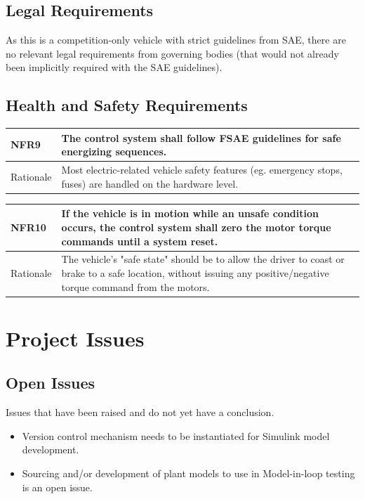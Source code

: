 \documentclass[12pt]{article}
\newcommand{\tableVspace}{5mm}
\newcommand{\ReqColA}{0.13\textwidth}
\newcommand{\ReqColB}{0.82\textwidth}
\begin{document}
\subsection{Legal Requirements}
As this is a competition-only vehicle with strict guidelines from SAE, there are no relevant legal requirements from governing bodies (that would not already been implicitly required with the SAE guidelines). 

\subsection{Health and Safety Requirements}

\vspace{\tableVspace}\noindent
\begin{tabular}{| p{\ReqColA} | p{\ReqColB}|}
\hline
\rowcolor[gray]{0.9}
NFR9 & The control system shall follow FSAE guidelines for safe energizing sequences. \\
\hline
Rationale & Most electric-related vehicle safety features (eg. emergency stops, fuses) are handled on the hardware level.\\
\hline
\end{tabular}

\vspace{\tableVspace}\noindent
\begin{tabular}{| p{\ReqColA} | p{\ReqColB}|}
\hline
\rowcolor[gray]{0.9}
NFR10 & If the vehicle is in motion while an unsafe condition occurs, the control system shall zero the motor torque commands until a system reset.\\
\hline
Rationale & The vehicle's "safe state" should be to allow the driver to coast or brake to a safe location, without issuing any positive/negative torque command from the motors.\\
\hline
\end{tabular}

\section{Project Issues}

\subsection{Open Issues}
Issues that have been raised and do not yet have a conclusion.
\begin{itemize}
    \item Version control mechanism needs to be instantiated for Simulink model development.  
    \item Sourcing and/or development of plant models to use in Model-in-loop testing is an open issue.
\end{itemize}
\end{document}
